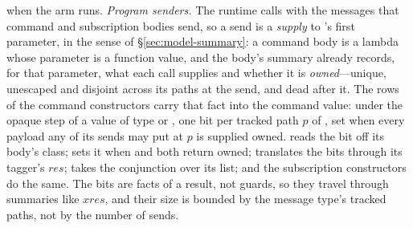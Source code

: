 \begin{description}[leftmargin=1.2em,font=\normalfont\itshape]
when the arm runs. \emph{Program senders.} The runtime calls  with the messages that command
and subscription bodies send, so a send is a \emph{supply} to 's first parameter, in the sense
of \S\ref{sec:model-summary}: a command body is a lambda whose parameter  is a function value,
and the body's summary already records, for that parameter, what each call supplies and whether it is
\emph{owned}---unique, unescaped and disjoint across its paths at the send, and dead after it. The rows of
the command constructors carry that fact into the command value: under the opaque step of a value of type
 or , one bit per tracked path $p$ of , set when every payload any of
its sends may put at $p$ is supplied owned.  reads the bit off its body's class;
 sets it when  and  both return owned; 
translates the bits through its tagger's $\mathit{res}$;  takes the conjunction over its
list;  and the subscription constructors do the same. The bits are facts of a result, not
guards, so they travel through summaries like $\mathit{xres}$, and their size is bounded by the message
type's tracked paths, not by the number of sends.


\end{description}
